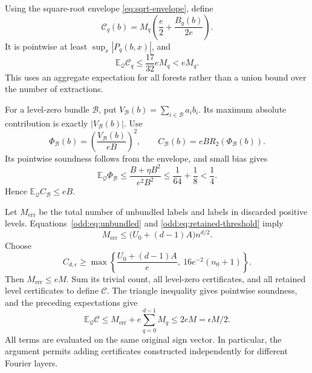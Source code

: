 \documentclass[letterpaper,11pt]{article}
\theoremstyle{definition}
\newcommand{\E}{\mathbb E}
\begin{document}
Using the square-root envelope \eqref{eq:sqrt-envelope}, define
\begin{equation}\label{odd:eq:level-certificate}
 \mathcal C_q(b)=M_q\left(\frac e2+\frac{B_q(b)}{2e}\right).
\end{equation}
It is pointwise at least $\sup_x|P_q(b,x)|$, and
\begin{equation}\label{odd:eq:level-expectation}
 \E_{\mathcal Q}\mathcal C_q
 \leq\frac{17}{32}eM_q<eM_q.
\end{equation}
This uses an aggregate expectation for all forests rather than a union
bound over the number of extractions.

For a level-zero bundle $\mathcal B$, put
$V_{\mathcal B}(b)=\sum_{i\in\mathcal B}a_i b_i$.  Its maximum absolute
contribution is exactly $|V_{\mathcal B}(b)|$.  Use
\[
 \Phi_{\mathcal B}(b)=\left(\frac{V_{\mathcal B}(b)}{eB}\right)^2,
 \qquad
 C_{\mathcal B}(b)=eB R_2(\Phi_{\mathcal B}(b)).
\]
Its pointwise soundness follows from the envelope, and small bias gives
\[
 \E_{\mathcal Q}\Phi_{\mathcal B}
 \leq\frac{B+\eta B^2}{e^2B^2}
 \leq\frac1{64}+\frac18<\frac14.
\]
Hence $\E_{\mathcal Q}C_{\mathcal B}\leq eB$.

Let $M_{\mathrm{err}}$ be the total number of unbundled labels and labels
in discarded positive levels.  Equations~\eqref{odd:eq:unbundled} and
\eqref{odd:eq:retained-threshold} imply
\[
 M_{\mathrm{err}}\leq\bigl(U_0+(d-1)A\bigr)n^{d/2}.
\]
Choose
\begin{equation}\label{odd:eq:final-density-constant}
 C_{d,\epsilon}\geq
 \max\left\{
 \frac{U_0+(d-1)A}{e},\
 16e^{-2}(n_0+1)\right\}.
\end{equation}
Then $M_{\mathrm{err}}\leq eM$.  Sum its trivial count, all level-zero
certificates, and all retained level certificates to define $\mathcal C$.
The triangle inequality gives pointwise soundness, and the preceding
expectations give
\[
 \E_{\mathcal Q}\mathcal C
 \leq M_{\mathrm{err}}+e\sum_{q=0}^{d-1}M_q
 \leq2eM=\epsilon M/2.
\]
All terms are evaluated on the same original sign vector.  In particular,
the argument permits adding certificates constructed independently for
different Fourier layers.
\end{document}
